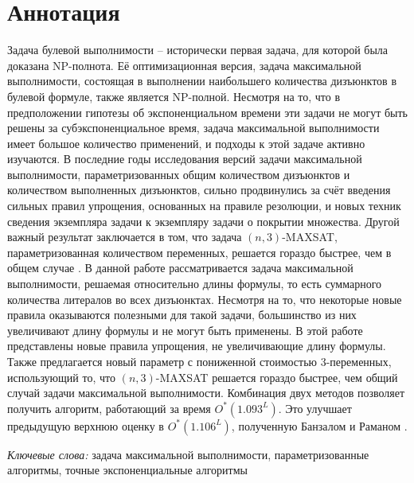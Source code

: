 
\section*{Аннотация}
\label{sec:annotation}

\firstpar{}Задача булевой выполнимости -- исторически первая задача, для которой была доказана NP-полнота. Её оптимизационная версия, задача максимальной выполнимости, состоящая в выполнении наибольшего количества дизъюнктов в булевой формуле, также является NP-полной. Несмотря на то, что в предположении гипотезы об экспоненциальном времени эти задачи не могут быть решены за субэкспоненциальное время, задача максимальной выполнимости имеет большое количество применений, и подходы к этой задаче активно изучаются. В последние годы исследования версий задачи максимальной выполнимости, параметризованных общим количеством дизъюнктов и количеством выполненных дизъюнктов, сильно продвинулись за счёт введения сильных правил упрощения, основанных на правиле резолюции, и новых техник сведения экземпляра задачи к экземпляру задачи о покрытии множества. Другой важный результат заключается в том, что задача $(n,3)$-MAXSAT, параметризованная количеством переменных, решается гораздо быстрее, чем в общем случае \cite{belova18}. В данной работе рассматривается задача максимальной выполнимости, решаемая относительно длины формулы, то есть суммарного количества литералов во всех дизъюнктах. Несмотря на то, что некоторые новые правила оказываются полезными для такой задачи, большинство из них увеличивают длину формулы и не могут быть применены. В этой работе представлены новые правила упрощения, не увеличивающие длину формулы. Также предлагается новый параметр с пониженной стоимостью 3-переменных, использующий то, что $(n,3)$-MAXSAT решается гораздо быстрее, чем общий случай задачи максимальной выполнимости. Комбинация двух методов позволяет получить алгоритм, работающий за время $O^*(1.093^L)$. Это улучшает предыдущую верхнюю оценку в $O^*(1.106^L)$, полученную Банзалом и Раманом \cite{bansal99}.

\vspace{14pt}

\textit{Ключевые слова:} задача максимальной выполнимости, параметризованные алгоритмы, точные экспоненциальные алгоритмы

\newpage

